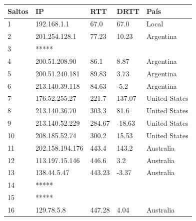 \begin{center}
    \begin{tabular}{| l | l | l | l | l | }
    \hline
    Saltos & IP                       & RTT   & DRTT     & País       \\ \hline
    1         &  192.168.1.1      & 67.0   &  67.0       & Local          \\ \hline
    2         &  201.254.128.1  & 77.23 & 10.23      & Argentina   \\ \hline
    3   	    & *****                   &           &               &                    \\ \hline
    4   	    & 200.51.208.90   & 86.1   & 8.87       & Argentina    \\ \hline
    5   	    & 200.51.240.181 & 89.83 & 3.73       & Argentina    \\ \hline
    6   	    & 213.140.39.118 & 84.63 & -5.2        & Argentina \\ \hline
    7   	    & 176.52.255.27   & 221.7   & 137.07 &  United States  \\ \hline
    8   	    & 213.140.36.70   & 303.3   & 81.6     & United States \\ \hline
    9   	    & 213.140.52.229 & 284.67 & -18.63  &  United States  \\ \hline
  10   	    & 208.185.52.74   & 300.2   & 15.53   & United States \\ \hline
  11   	    & 202.158.194.176 & 443.4 & 143.2   & Australia  \\ \hline
  12   	    & 113.197.15.146  & 446.6  & 3.2       & Australia \\ \hline
  13   	    & 138.44.5.47        & 443.23 & -3.37   & Australia \\ \hline
  14   	    & *****                    &              &           & \\ \hline
  15   	    & *****                    &              &           &\\ \hline
  16   	    & 129.78.5.8          & 447.28  &  4.04  & Australia \\ \hline

  \end{tabular}
\end{center}

